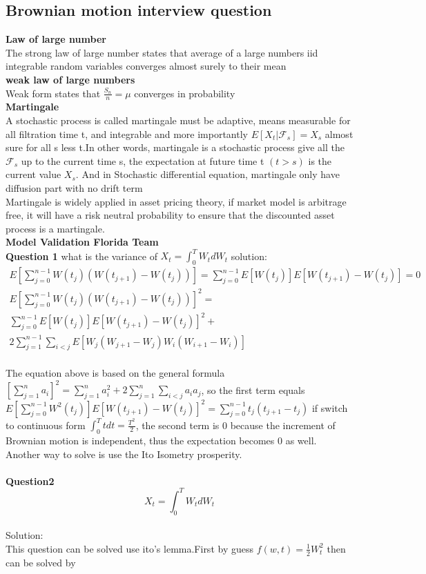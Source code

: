 \documentclass[a4paper,11pt]{article}
\begin{document}
\subsection{Brownian motion interview question}
{\bf Law of large number}\\
The strong law of large number states that average of a large numbers iid integrable random variables converges almost surely to their mean\\
{\bf weak law of large numbers}\\
Weak form states that $\frac{S_n}{n} =\mu$ converges in probability\\
{\bf Martingale}\\
A stochastic process is called martingale must be adaptive, means measurable for all filtration time t, and integrable and more importantly $E[X_t|\mathcal{F}_s]=X_s$ almost sure for all s less t.In other words, martingale is a stochastic process give all the  $\mathcal{F}_s$ up to the current time s, the expectation at future time t $(t>s)$ is the current value $X_s$. And in Stochastic differential equation, martingale only have diffusion part with no drift term\\
Martingale is widely applied in asset pricing theory, if market model is arbitrage free, it will have a risk neutral probability to ensure that the discounted asset process is a martingale.\\

{\bf Model Validation Florida Team}\\
{\bf Question 1}
what is the variance of $X_t=\int_0^T W_t dW_t$
solution:
\begin{equation}
\begin{aligned}
E[\sum\limits_{j=0}^{n-1} W(t_j)(W(t_{j+1})-W(t_j))] = \sum\limits_{j=0}^{n-1} E[W(t_j)]E[W(t_{j+1})-W(t_j)]=0\\
E[\sum\limits_{j=0}^{n-1}W(t_j)(W(t_{j+1})-W(t_j))]^2=\\
\sum\limits_{j=0}^{n-1}E[W(t_j)]E[W(t_{j+1})-W(t_j)]^2+\\
2\sum\limits_{j=1}^{n-1}\sum\limits_{i<j} E[W_j(W_{j+1}-W_j)W_i(W_{i+1}-W_i)]
\end{aligned}
\end{equation}\\
The equation above is based on the general formula $[\sum\limits_{j=1}^{n} a_i]^2=\sum\limits_{j=1}^{n} a_i^2+2\sum\limits_{j=1}^{n}\sum\limits_{i<j}a_i a_j$, so the first term equals $E[\sum\limits_{j=0}^{n-1}W^2(t_j)]E[W(t_{j+1})-W(t_j)]^2=\sum\limits_{j=0}^{n-1}t_j(t_{j+1}-t_j)$ if switch to continuous form $\int_0^T tdt=\frac{T^2}{2}$, the second term is 0 because the increment of Brownian motion is
independent, thus the expectation becomes 0 as well. Another way to solve is use the Ito Isometry prosperity.\\ \\
{\bf Question2}
\begin{equation}
X_t=\int_0^T W_t dW_t
\end{equation}\\
Solution:\\
This question can be solved use ito's lemma.First by guess $f(w,t)=\frac{1}{2} W_t^2$ then can be solved by
\end{document}
